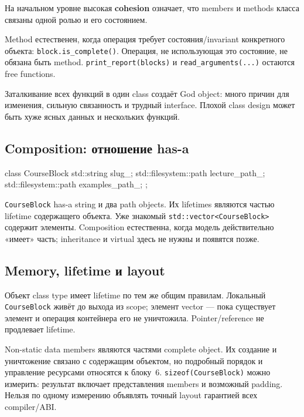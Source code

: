 \begin{definition}
На начальном уровне высокая \textbf{cohesion} означает, что members и methods
класса связаны одной ролью и его состоянием.
\end{definition}

Method естественен, когда операция требует состояния/invariant конкретного
объекта: \texttt{block.is\_complete()}. Операция, не использующая это
состояние, не обязана быть method. \texttt{print\_report(blocks)} и
\texttt{read\_arguments(...)} остаются free functions.

Заталкивание всех функций в один class создаёт God object: много причин для
изменения, сильную связанность и трудный interface. Плохой class design может
быть хуже ясных данных и нескольких функций.

\subsection{Composition: отношение has-a}

\begin{cppcode}
class CourseBlock {
    std::string slug_;
    std::filesystem::path lecture_path_;
    std::filesystem::path examples_path_;
};
\end{cppcode}

\texttt{CourseBlock} has-a string и два path objects. Их lifetimes являются
частью lifetime содержащего объекта. Уже знакомый
\texttt{std::vector<CourseBlock>} содержит элементы. Composition естественна,
когда модель действительно «имеет» часть; inheritance и virtual здесь не
нужны и появятся позже.

\subsection{Memory, lifetime и layout}

Объект class type имеет lifetime по тем же общим правилам. Локальный
\texttt{CourseBlock} живёт до выхода из scope; элемент vector --- пока
существует элемент и операция контейнера его не уничтожила. Pointer/reference
не продлевает lifetime.

Non-static data members являются частями complete object. Их создание и
уничтожение связано с содержащим объектом, но подробный порядок и управление
ресурсами относятся к блоку~6. \texttt{sizeof(CourseBlock)} можно измерить:
результат включает представления members и возможный padding. Нельзя по одному
измерению объявлять точный layout гарантией всех compiler/ABI.

